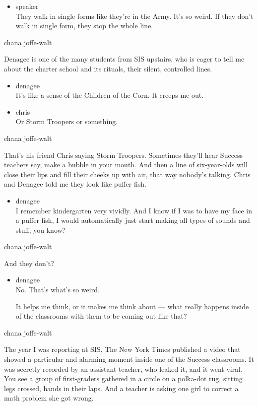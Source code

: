 \begin{itemize}
\tightlist
\item
  speaker\\
  They walk in single forms like they're in the Army. It's so weird. If
  they don't walk in single form, they stop the whole line.
\end{itemize}

chana joffe-walt

Denagee is one of the many students from SIS upstairs, who is eager to
tell me about the charter school and its rituals, their silent,
controlled lines.

\begin{itemize}
\item
  denagee\\
  It's like a sense of the Children of the Corn. It creeps me out.
\item
  chris\\
  Or Storm Troopers or something.
\end{itemize}

chana joffe-walt

That's his friend Chris saying Storm Troopers. Sometimes they'll hear
Success teachers say, make a bubble in your mouth. And then a line of
six-year-olds will close their lips and fill their cheeks up with air,
that way nobody's talking. Chris and Denagee told me they look like
puffer fish.

\begin{itemize}
\tightlist
\item
  denagee\\
  I remember kindergarten very vividly. And I know if I was to have my
  face in a puffer fish, I would automatically just start making all
  types of sounds and stuff, you know?
\end{itemize}

chana joffe-walt

And they don't?

\begin{itemize}
\item
  denagee\\
  No. That's what's so weird.

  It helps me think, or it makes me think about --- what really happens
  inside of the classrooms with them to be coming out like that?
\end{itemize}

chana joffe-walt

The year I was reporting at SIS, The New York Times published a video
that showed a particular and alarming moment inside one of the Success
classrooms. It was secretly recorded by an assistant teacher, who leaked
it, and it went viral. You see a group of first-graders gathered in a
circle on a polka-dot rug, sitting legs crossed, hands in their laps.
And a teacher is asking one girl to correct a math problem she got
wrong.

